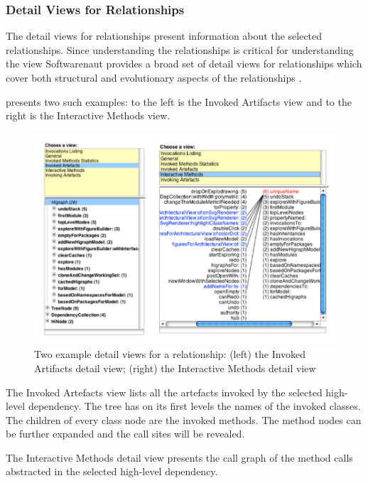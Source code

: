 \documentclass[preprint,12pt]{elsarticle}
\begin{document}
\subsubsection {Detail Views for Relationships}
The detail views for relationships present information about the selected relationships. Since understanding the relationships is critical for understanding the view Softwarenaut provides a broad set of detail views for relationships which cover both structural and evolutionary aspects of the relationships \cite{lungu-cutedge, lungu-relevo}. 

 presents two such examples: to the left is the Invoked Artifacts view and to the right is the Interactive Methods view. 

\begin{figure}[h!]
\begin{center}
\includegraphics[width=\linewidth]{images/DetailsForEdge}
\caption{Two example detail views for a relationship: (left) the Invoked Artifacts detail view; (right) the Interactive Methods detail view}
\end{center}
\end{figure}
The Invoked Artefacts view lists all the artefacts invoked by the selected high-level dependency. The tree has on its first levels the names of the invoked classes. The children of every class node are the invoked methods. The method nodes can be further expanded and the call sites will be revealed. 

The Interactive Methods detail view presents the call graph of the method calls abstracted in the selected high-level dependency. 
\end{document}
